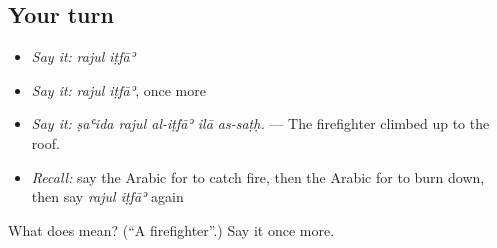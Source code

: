\subsection*{Your turn}
\begin{itemize}
\raggedright
  \item \emph{Say it:} \emph{rajul iṭfāʾ}
  \item \emph{Say it:} \emph{rajul iṭfāʾ}, once more
  \item \emph{Say it:} \emph{ṣaʿida rajul al-iṭfāʾ ilā as-saṭḥ.} — The firefighter climbed up to the roof.
  \item \emph{Recall:} say the Arabic for to catch fire, then the Arabic for to burn down, then say \emph{rajul iṭfāʾ} again
\end{itemize}

\begin{tcolorbox}[breakable,colback=teal!4,colframe=teal!35!black,title={Before you move on}]
What does   mean? (\textquotedblleft{}A firefighter\textquotedblright{}.) Say it once more.
\end{tcolorbox}
